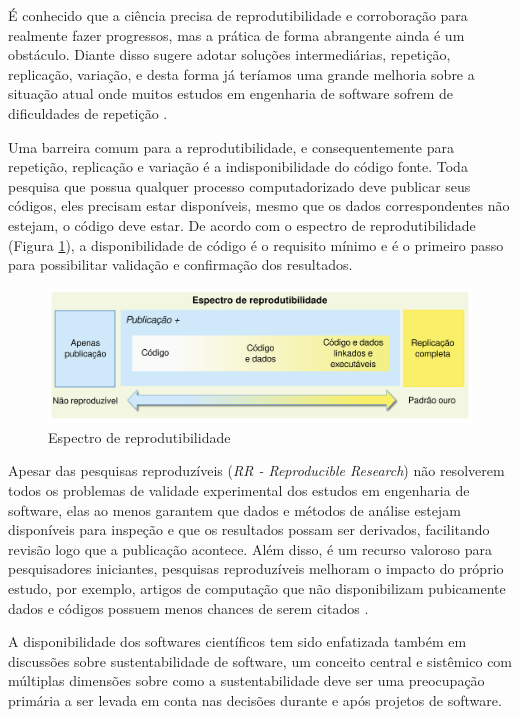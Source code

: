 É conhecido que a ciência precisa de reprodutibilidade e corroboração para
realmente fazer progressos, mas a prática de forma abrangente ainda é um
obstáculo. Diante disso  sugere adotar soluções
intermediárias, repetição, replicação, variação, e desta forma já teríamos uma
grande melhoria sobre a situação atual onde muitos estudos em engenharia de
software sofrem de dificuldades de repetição \cite{Tang2016}.

Uma barreira comum para a reprodutibilidade, e consequentemente para repetição,
replicação e variação é a indisponibilidade do código fonte. Toda pesquisa que
possua qualquer processo computadorizado deve publicar seus códigos, eles
precisam estar disponíveis, mesmo que os dados correspondentes não estejam, o
código deve estar. De acordo com o espectro de reprodutibilidade (Figura
\ref{reproducibility-spectrum}), a disponibilidade de código é o requisito
mínimo e é o primeiro passo para possibilitar validação e confirmação dos
resultados.

\begin{figure}[h]
  \center
  \includegraphics[scale=0.35]{imagens/reproducibility-spectrum-ptbr.png}
  \caption{Espectro de reprodutibilidade \cite{Peng2011}}
  \label{reproducibility-spectrum}
\end{figure}

Apesar das pesquisas reproduzíveis ({\it RR - Reproducible Research}) não
resolverem todos os problemas de validade experimental dos estudos em
engenharia de software, elas ao menos garantem que dados e métodos de análise
estejam disponíveis para inspeção e que os resultados possam ser derivados,
facilitando revisão logo que a publicação acontece. Além disso, é um recurso
valoroso para pesquisadores iniciantes, pesquisas reproduzíveis melhoram o
impacto do próprio estudo, por exemplo, artigos de computação que não
disponibilizam pubicamente dados e códigos possuem menos chances de serem
citados \cite{madeyski2017would}.

A disponibilidade dos softwares científicos tem sido enfatizada também em
discussões sobre sustentabilidade de software, um conceito central e sistêmico
com múltiplas dimensões sobre como a sustentabilidade deve ser uma preocupação
primária a ser levada em conta nas decisões durante e após projetos de
software.

